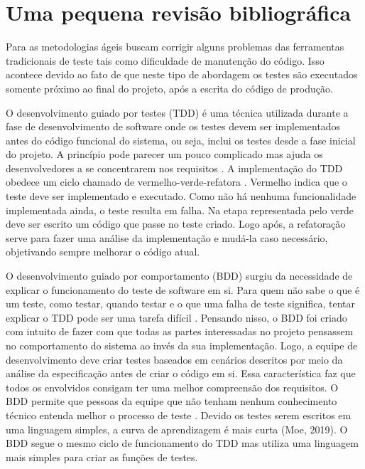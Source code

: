 \chapter{Uma pequena revisão bibliográfica}\label{CAP:2}


Para \cite{palod2016agile} as metodologias ágeis buscam corrigir alguns problemas das ferramentas tradicionais de teste tais como dificuldade de manutenção do código. Isso acontece devido ao fato de que neste tipo de abordagem os testes são executados somente próximo ao final do projeto,  após a escrita do código de produção.

O desenvolvimento guiado por testes (TDD) é uma técnica utilizada durante a fase de desenvolvimento de software onde os testes devem ser implementados antes do código funcional do sistema, ou seja, inclui os testes desde a fase inicial do projeto. A princípio pode parecer um pouco complicado mas ajuda os desenvolvedores a se concentrarem nos requisitos \cite{moe2019comparative}. A implementação do TDD obedece um ciclo chamado de vermelho-verde-refatora \cite{bulgareli2015requisitos}. Vermelho indica que o teste deve ser implementado e executado. Como não há nenhuma funcionalidade implementada ainda, o teste resulta em falha. Na etapa representada pelo verde deve ser escrito um código que passe no teste criado. Logo após, a refatoração serve para fazer uma análise da implementação e mudá-la caso necessário, objetivando sempre melhorar o código atual.

O desenvolvimento guiado por comportamento (BDD) surgiu da necessidade de explicar o funcionamento do teste de software em si. Para quem não sabe o que é um teste, como testar, quando testar e o que uma falha de teste significa, tentar explicar o TDD pode ser uma tarefa difícil \cite{bulgareli2015requisitos}. Pensando nisso, o BDD foi criado com intuito de fazer com que  todas as partes interessadas no projeto pensassem no comportamento do sistema ao invés da sua implementação. Logo, a equipe de desenvolvimento deve criar testes baseados em cenários descritos por meio da análise da especificação antes de criar o código em si. Essa característica faz que todos os envolvidos consigam ter uma melhor compreensão dos requisitos. O BDD permite que pessoas da equipe que não tenham nenhum conhecimento técnico entenda melhor o processo de teste \cite{barus2019implementaion}. Devido os testes serem escritos em uma linguagem simples, a curva de aprendizagem é mais curta (Moe, 2019). O BDD segue o mesmo ciclo de funcionamento do TDD mas utiliza uma linguagem mais simples para criar as funções de testes.

